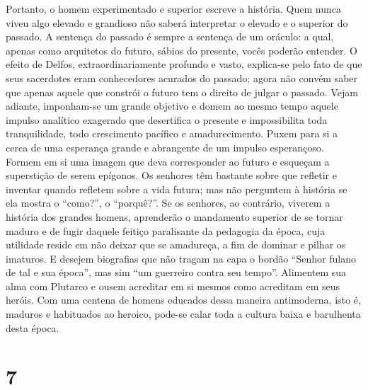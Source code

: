 Portanto, o homem experimentado e superior escreve a história. Quem
nunca viveu algo elevado e grandioso não saberá interpretar o elevado e
o superior do passado. A sentença do passado é sempre a sentença de um
oráculo: a qual, apenas como arquitetos do futuro, sábios do presente,
vocês poderão entender. O efeito de Delfos, extraordinariamente profundo
e vasto, explica-se pelo fato de que seus sacerdotes eram conhecedores
acurados do passado; agora não convém saber que apenas aquele que
constrói o futuro tem o direito de julgar o passado. Vejam adiante,
imponham-se um grande objetivo e domem ao mesmo tempo aquele impulso
analítico exagerado que desertifica o presente e impossibilita toda
tranquilidade, todo crescimento pacífico e amadurecimento. Puxem para si
a cerca de uma esperança grande e abrangente de um impulso esperançoso.
Formem em si uma imagem que deva corresponder ao futuro e esqueçam a
superstição de serem epígonos. Os senhores têm bastante sobre que refletir
e inventar quando refletem sobre a vida futura; mas não perguntem à
história se ela mostra o ``como?'', o ``porquê?''. Se os senhores, ao
contrário, viverem a história dos grandes homens, aprenderão o
mandamento superior de se tornar maduro e de fugir daquele feitiço
paralisante da pedagogia da época, cuja utilidade reside em não deixar
que se amadureça, a fim de dominar e pilhar os imaturos. E desejem
biografias que não tragam na capa o bordão ``Senhor fulano de tal e sua
época'', mas sim ``um guerreiro contra seu tempo''. Alimentem sua alma
com Plutarco e ousem acreditar em si mesmos como acreditam em seus
heróis. Com uma centena de homens educados dessa maneira antimoderna,
isto é, maduros e habituados ao heroico, pode-se calar toda a cultura
baixa e barulhenta desta época.

\chapter{7}\label{capuxedtulo-7}

